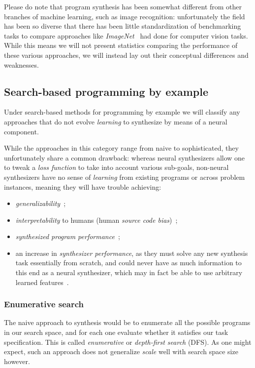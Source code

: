 \documentclass{article}
\begin{document}
Please do note that program synthesis has been somewhat different
from other branches of machine learning, such as image recognition:
unfortunately the field has been so diverse that there has been little
standardization of benchmarking tasks to compare approaches like
\emph{ImageNet}~\citep{deng2009imagenet} had done for computer vision tasks.
While this means we will not present statistics
comparing the performance of these various approaches,
we will instead lay out their conceptual differences and weaknesses.

\subsection{Search-based programming by example}

Under search-based methods for programming by example we will classify any approaches that do not evolve \emph{learning} to synthesize by means of a neural component.

While the approaches in this category range from naive to sophisticated,
they unfortunately share a common drawback:
whereas neural synthesizers allow one to tweak a \emph{loss function} to take into account various sub-goals,
non-neural synthesizers have no sense of \emph{learning}
from existing programs or across problem instances,
meaning they will have trouble achieving:
\begin{itemize}
    \item \emph{generalizability}~\citep{nps};
    \item \emph{interpretability} to humans (human \emph{source code bias})~\citep{nps};
    \item \emph{synthesized program performance}~\citep{schkufza2016stochastic};
    \item an increase in \emph{synthesizer performance},
    as they must solve any new synthesis task essentially from scratch,
    and could never have as much information to this end as a neural synthesizer,
    which may in fact be able to use arbitrary learned features~\citep{odena2020learning}.
\end{itemize}

\subsubsection{Enumerative search}

The naive approach to synthesis would be to enumerate all the possible programs in our search space,
and for each one evaluate whether it satisfies our task specification.
This is called \emph{enumerative} or \emph{depth-first search} (DFS).
As one might expect, such an approach does not generalize \emph{scale} well with search space size however.
\end{document}
